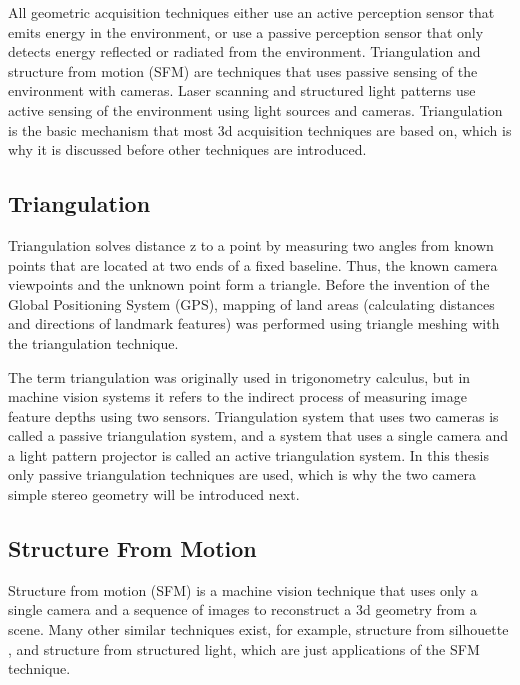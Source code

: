 \documentclass[12pt,a4paper,oneside,pdftex]{report}
\begin{document}
{All geometric acquisition techniques either use an active perception sensor that emits energy in the environment, or use a passive perception sensor that only detects energy reflected or radiated from the environment. Triangulation and structure from motion (SFM) are techniques that uses passive sensing of the environment with cameras. Laser scanning and structured light patterns use active sensing of the environment using light sources and cameras.
Triangulation is the basic mechanism that most 3d acquisition techniques are based on, which is why it is discussed before other techniques are introduced.

\subsection{Triangulation}
\label{subsection:triangulation}

Triangulation solves distance z to a point by measuring two angles from known points that are located at two ends of a fixed baseline. Thus, the known camera viewpoints and the unknown point form a triangle. Before the invention of the Global Positioning System (GPS), mapping of land areas (calculating distances and directions of landmark features) was performed using triangle meshing with the triangulation technique.

The term triangulation was originally used in trigonometry calculus, but in machine vision systems it refers to the indirect process of measuring image feature depths using two sensors. Triangulation system that uses two cameras is called a passive triangulation system, and a system that uses a single camera and a light pattern projector is called an active triangulation system. In this thesis only passive triangulation techniques are used, which is why the two camera simple stereo geometry will be introduced next.

\subsection{Structure From Motion}
\label{subsection:structure_from_motion}

Structure from motion (SFM) is a machine vision technique that uses only a single camera and a sequence of images to  reconstruct a 3d geometry from a scene. Many other similar techniques exist, for example, structure from silhouette
, and structure from structured light, which are just applications of the SFM technique.

}
\end{document}
